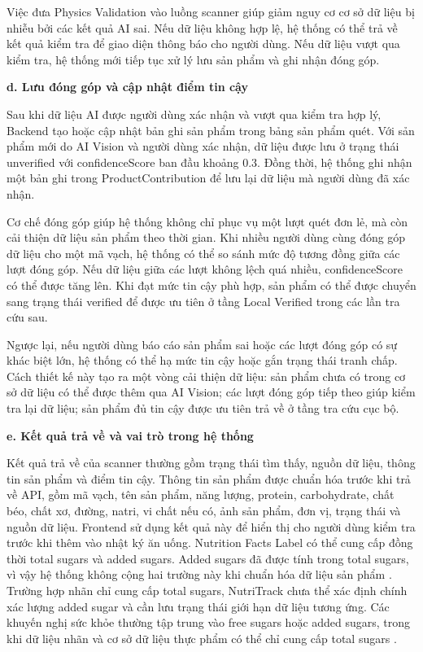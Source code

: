 \documentclass[12pt, a4paper]{report}
\begin{document}
Việc đưa Physics Validation vào luồng scanner giúp giảm nguy cơ cơ sở dữ liệu bị nhiễu bởi các kết quả AI sai. Nếu dữ liệu không hợp lệ, hệ thống có thể trả về kết quả kiểm tra để giao diện thông báo cho người dùng. Nếu dữ liệu vượt qua kiểm tra, hệ thống mới tiếp tục xử lý lưu sản phẩm và ghi nhận đóng góp.

\textbf{d. Lưu đóng góp và cập nhật điểm tin cậy}

Sau khi dữ liệu AI được người dùng xác nhận và vượt qua kiểm tra hợp lý, Backend tạo hoặc cập nhật bản ghi sản phẩm trong bảng sản phẩm quét. Với sản phẩm mới do AI Vision và người dùng xác nhận, dữ liệu được lưu ở trạng thái unverified với confidenceScore ban đầu khoảng 0.3. Đồng thời, hệ thống ghi nhận một bản ghi trong ProductContribution để lưu lại dữ liệu mà người dùng đã xác nhận.

Cơ chế đóng góp giúp hệ thống không chỉ phục vụ một lượt quét đơn lẻ, mà còn cải thiện dữ liệu sản phẩm theo thời gian. Khi nhiều người dùng cùng đóng góp dữ liệu cho một mã vạch, hệ thống có thể so sánh mức độ tương đồng giữa các lượt đóng góp. Nếu dữ liệu giữa các lượt không lệch quá nhiều, confidenceScore có thể được tăng lên. Khi đạt mức tin cậy phù hợp, sản phẩm có thể được chuyển sang trạng thái verified để được ưu tiên ở tầng Local Verified trong các lần tra cứu sau.

Ngược lại, nếu người dùng báo cáo sản phẩm sai hoặc các lượt đóng góp có sự khác biệt lớn, hệ thống có thể hạ mức tin cậy hoặc gắn trạng thái tranh chấp. Cách thiết kế này tạo ra một vòng cải thiện dữ liệu: sản phẩm chưa có trong cơ sở dữ liệu có thể được thêm qua AI Vision; các lượt đóng góp tiếp theo giúp kiểm tra lại dữ liệu; sản phẩm đủ tin cậy được ưu tiên trả về ở tầng tra cứu cục bộ.

\textbf{e. Kết quả trả về và vai trò trong hệ thống}

Kết quả trả về của scanner thường gồm trạng thái tìm thấy, nguồn dữ liệu, thông tin sản phẩm và điểm tin cậy. Thông tin sản phẩm được chuẩn hóa trước khi trả về API, gồm mã vạch, tên sản phẩm, năng lượng, protein, carbohydrate, chất béo, chất xơ, đường, natri, vi chất nếu có, ảnh sản phẩm, đơn vị, trạng thái và nguồn dữ liệu. Frontend sử dụng kết quả này để hiển thị cho người dùng kiểm tra trước khi thêm vào nhật ký ăn uống. Nutrition Facts Label có thể cung cấp đồng thời total sugars và added sugars. Added sugars đã được tính trong total sugars, vì vậy hệ thống không cộng hai trường này khi chuẩn hóa dữ liệu sản phẩm \cite{fda_addedsugars}. Trường hợp nhãn chỉ cung cấp total sugars, NutriTrack chưa thể xác định chính xác lượng added sugar và cần lưu trạng thái giới hạn dữ liệu tương ứng. Các khuyến nghị sức khỏe thường tập trung vào free sugars hoặc added sugars, trong khi dữ liệu nhãn và cơ sở dữ liệu thực phẩm có thể chỉ cung cấp total sugars \cite{mela2018}.
\end{document}
